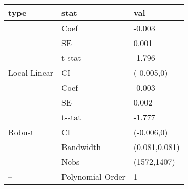 
\begin{tabular}{lll}
\toprule
type & stat & val\\
\midrule
 & Coef & -0.003\\

 & SE & 0.001\\

 & t-stat & -1.796\\

\multirow{-4}{*}{\raggedright\arraybackslash Local-Linear} & CI & (-0.005,0)\\
\cmidrule{1-3}
 & Coef & -0.003\\

 & SE & 0.002\\

 & t-stat & -1.777\\

\multirow{-4}{*}{\raggedright\arraybackslash Robust} & CI & (-0.006,0)\\
\cmidrule{1-3}
 & Bandwidth & (0.081,0.081)\\

 & Nobs & (1572,1407)\\

\multirow{-3}{*}{\raggedright\arraybackslash --} & Polynomial Order & 1\\
\bottomrule
\end{tabular}